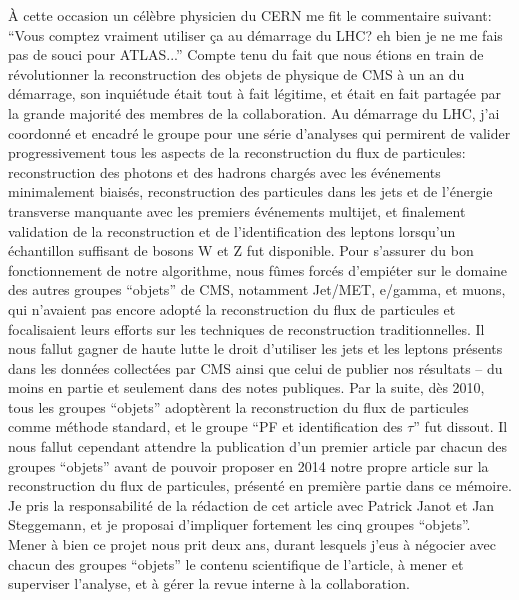 \documentclass[11pt,twoside,a4paper,tdr]{cms-tdr}
\begin{document}
À cette occasion un célèbre physicien du CERN me fit le commentaire suivant: 
``Vous comptez vraiment utiliser ça au démarrage du LHC? eh bien je ne me fais pas de souci pour ATLAS...''
Compte tenu du fait que nous étions en train de révolutionner la reconstruction des objets de physique de CMS à un an du démarrage, son inquiétude était tout à fait légitime, et était en fait partagée par la grande majorité des membres de la collaboration. 
Au démarrage du LHC, j'ai coordonné et encadré le groupe pour une série d'analyses qui permirent de valider progressivement tous les aspects de la reconstruction du flux de particules: reconstruction des photons et des hadrons chargés avec les événements minimalement biaisés, reconstruction des particules dans les jets et de l'énergie transverse manquante avec les premiers événements multijet, et finalement validation de la reconstruction et de l'identification des leptons lorsqu'un échantillon suffisant de bosons W et Z fut disponible. 
Pour s'assurer du bon fonctionnement de notre algorithme, nous fûmes forcés d'empiéter sur le domaine des autres groupes ``objets'' de CMS, notamment Jet/MET, e/gamma, et muons, qui n'avaient pas encore adopté la reconstruction du flux de particules et focalisaient leurs efforts sur les techniques de reconstruction traditionnelles. Il nous fallut gagner de haute lutte le droit d'utiliser les jets et les leptons présents dans les données collectées par CMS ainsi que celui de publier nos résultats -- du moins en partie et seulement dans des notes publiques. 
Par la suite, dès 2010, tous les groupes ``objets'' adoptèrent la reconstruction du flux de particules comme méthode standard, et le groupe ``PF et identification des $\tau$'' fut dissout. 
Il nous fallut cependant attendre la publication d'un premier article par chacun des groupes ``objets'' avant de pouvoir proposer en 2014 notre propre article sur la reconstruction du flux de particules, présenté en première partie dans ce mémoire. 
Je pris la responsabilité de la rédaction de cet article avec Patrick Janot et Jan Steggemann, 
et je proposai d'impliquer fortement les cinq groupes ``objets''. 
Mener à bien ce projet nous prit deux ans, durant lesquels j'eus à négocier avec chacun des groupes ``objets'' le contenu scientifique de l'article, à mener et superviser l'analyse, et à gérer la revue interne à la collaboration. 
\end{document}
